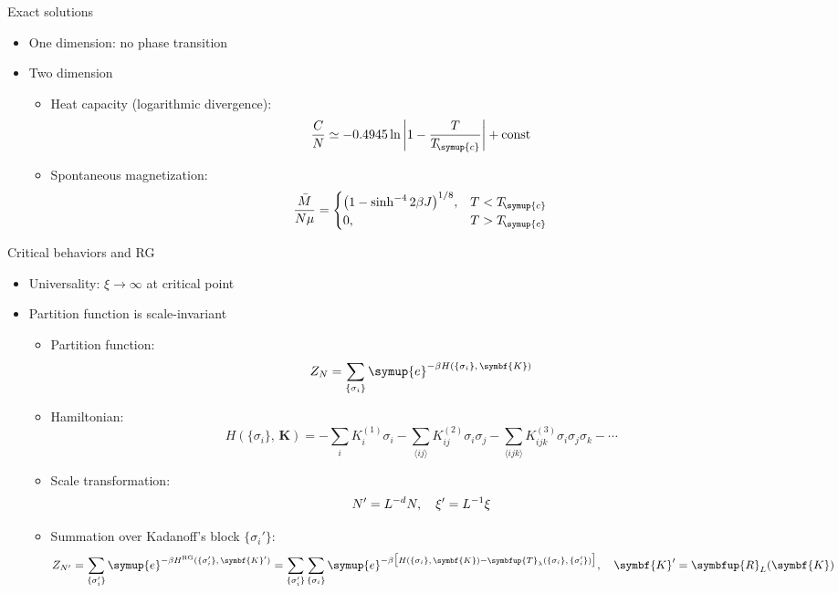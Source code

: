 \documentclass[aspectratio=169]{beamer}
\def\ee{{\symup{e}}}
\def\Tc{T_{\!\symup{c}}}
\def\opT{{\symbfup{T}}}
\newcommand\trR[2][]{\symbfup{R}^{\,#1}_{#2}}
\def\bm#1{{\symbf{#1}}}
\def\nearest#1{\langle#1\rangle}
\def\q#1{{\{#1\}}}
\def\const{\text{const}}
\begin{document}
\begin{frame}{Exact solutions}
\begin{itemize}
  \item One dimension: no phase transition
  \item Two dimension
    \begin{itemize}
      \item Heat capacity (logarithmic divergence):
        \[ \frac{C}{N} \simeq \num{-0.4945} \ln\abs{1-\frac{T}{\Tc}} + \const \]
      \item Spontaneous magnetization:
        \[
          \frac{\bar{M}}{N\mu} =
          \begin{cases}
            \qty(1 - \sinh^{-4} 2\beta J)^{1/8}, & T<\Tc \\
            0, & T>\Tc
          \end{cases}
        \]
    \end{itemize}
\end{itemize}
\end{frame}

\begin{frame}{Critical behaviors and RG}
\begin{itemize}
  \item Universality: $\xi\to\infty$ at critical point
  \item Partition function is scale-invariant
    \begin{itemize}
      \item Partition function:
        \[ Z_N = \sum_\q{\sigma_i} \ee^{-\beta H(\q{\sigma_i},\,\bm{K})} \]
      \item Hamiltonian:
        \[
            H(\q{\sigma_i},\,\bm{K})
          = - \sum_i K^{(1)}_i \sigma_i
            - \sum_{\nearest{ij}}  K^{(2)}_{ij}  \sigma_i\sigma_j
            - \sum_{\nearest{ijk}} K^{(3)}_{ijk} \sigma_i\sigma_j\sigma_k - \cdots
        \]
      \item Scale transformation:
        \[ N' = L^{-d} N \qc \xi' = L^{-1} \xi \]
      \item Summation over Kadanoff's block $\q{\sigma_i'}$:
        \[
          Z_{N'}
          = \sum_\q{\sigma'_i} \ee^{-\beta H^{\text{RG}}(\q{\sigma_i'},\,\bm{K}')}
          = \sum_\q{\sigma'_i} \sum_\q{\sigma_i}
            \ee^{-\beta \qty\big[H(\q{\sigma_i},\,\bm{K})
                 -\opT_\lambda(\q{\sigma_i},\,\q{\sigma_i'})]} \qc
          \bm{K}' = \trR{L}(\bm{K})
        \]
    \end{itemize}
\end{itemize}
\end{frame}
\end{document}
